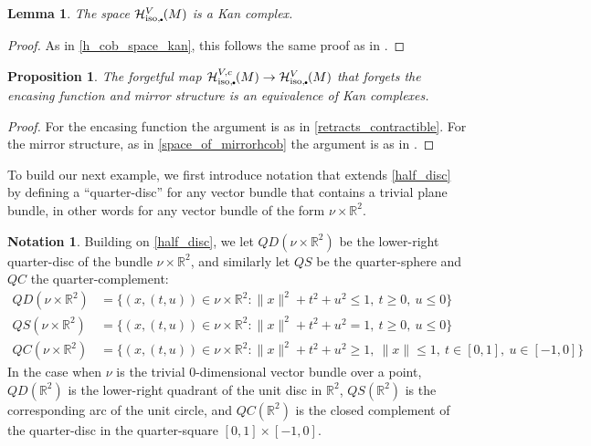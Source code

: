 \documentclass[11pt]{amsart}
\newtheorem{prop}{Proposition}[section]
\newtheorem{lem}{Lemma}[section]
\theoremstyle{definition}
\newtheorem{notn}{Notation}[section]
\numberwithin{equation}{section}
\numberwithin{figure}{section}
\newcommand{\R}{\mathbb R}
\newcommand{\mc}{\mathcal}
\newcommand{\iso}{\mathrm{iso}}
\newcommand{\sbt}{\,\begin{picture}(-1,1)(0.5,-1)\circle*{1.8}\end{picture}\hspace{.05cm}}
\begin{document}
\begin{lem}\label{h_cob_space_rel_v_kan}
	The space $\mc H_{\iso,\sbt}^{V}(M)$ is a Kan complex.
\end{lem}

\begin{proof}
	As in \autoref{h_cob_space_kan}, this follows the same proof as in \cite[Lem 4.11]{GIMM1}.
\end{proof}

\begin{prop}\label{encased_forgetful_side}
	The forgetful map $\mc H_{\iso,\sbt}^{V,c}(M) \to \mc H_{\iso,\sbt}^V(M)$ that forgets the encasing function and mirror structure is an equivalence of Kan complexes.
\end{prop}

\begin{proof}
	For the encasing function the argument is as in \autoref{retracts_contractible}. For the mirror structure, as in \autoref{space_of_mirrorhcob} the argument is as in \cite{GIMM1}. %
\end{proof}

To build our next example, we first introduce notation that extends \autoref{half_disc} by defining a ``quarter-disc'' for any vector bundle that contains a trivial plane bundle, in other words for any vector bundle of the form $\nu \times \R^2$.

\begin{notn}\label{quarter_disc}
	Building on \autoref{half_disc}, we let $QD(\nu \times \R^2)$ be the lower-right quarter-disc of the bundle $\nu \times \R^2$, and similarly let $QS$ be the quarter-sphere and $QC$ the quarter-complement:
	\begin{align*}
		QD(\nu \times \R^2) &= \{ (x,(t,u)) \in \nu \times \R^2 : \|x\|^2 + t^2 + u^2 \leq 1, \ t \geq 0, \ u \leq 0 \} \\
		QS(\nu \times \R^2) &= \{ (x,(t,u)) \in \nu \times \R^2 : \|x\|^2 + t^2 + u^2 = 1, \ t \geq 0, \ u \leq 0 \} \\
		QC(\nu \times \R^2) &= \{ (x,(t,u)) \in \nu \times \R^2 : \|x\|^2 + t^2 + u^2 \geq 1, \ \|x\| \leq 1, \ t \in [0,1], \ u \in [-1,0] \}
	\end{align*}
	In the case when $\nu$ is the trivial 0-dimensional vector bundle over a point, $QD(\R^2)$ is the lower-right quadrant of the unit disc in $\R^2$, $QS(\R^2)$ is the corresponding arc of the unit circle, and $QC(\R^2)$ is the closed complement of the quarter-disc in the quarter-square $[0,1] \times [-1,0]$.
\end{notn}
	
\end{document}
